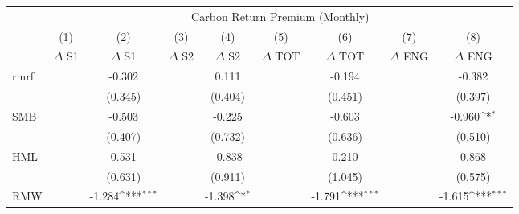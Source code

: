 {
\def\sym#1{\ifmmode^{#1}\else\(^{#1}\)\fi}
\begin{tabular}{l*{8}{c}}
\hline\hline
                    &\multicolumn{8}{c}{Carbon Return Premium (Monthly)}                                                                                                                            \\\cmidrule(lr){2-9}
                    &\multicolumn{1}{c}{(1)}&\multicolumn{1}{c}{(2)}&\multicolumn{1}{c}{(3)}&\multicolumn{1}{c}{(4)}&\multicolumn{1}{c}{(5)}&\multicolumn{1}{c}{(6)}&\multicolumn{1}{c}{(7)}&\multicolumn{1}{c}{(8)}\\
                    &\multicolumn{1}{c}{$\Delta$ S1}&\multicolumn{1}{c}{$\Delta$ S1}&\multicolumn{1}{c}{$\Delta$ S2}&\multicolumn{1}{c}{$\Delta$ S2}&\multicolumn{1}{c}{$\Delta$ TOT}&\multicolumn{1}{c}{$\Delta$ TOT}&\multicolumn{1}{c}{$\Delta$ ENG}&\multicolumn{1}{c}{$\Delta$ ENG}\\
\hline
rmrf                &                     &      -0.302         &                     &       0.111         &                     &      -0.194         &                     &      -0.382         \\
                    &                     &     (0.345)         &                     &     (0.404)         &                     &     (0.451)         &                     &     (0.397)         \\
SMB                 &                     &      -0.503         &                     &      -0.225         &                     &      -0.603         &                     &      -0.960\sym{*}  \\
                    &                     &     (0.407)         &                     &     (0.732)         &                     &     (0.636)         &                     &     (0.510)         \\
HML                 &                     &       0.531         &                     &      -0.838         &                     &       0.210         &                     &       0.868         \\
                    &                     &     (0.631)         &                     &     (0.911)         &                     &     (1.045)         &                     &     (0.575)         \\
RMW                 &                     &      -1.284\sym{***}&                     &      -1.398\sym{*}  &                     &      -1.791\sym{***}&                     &      -1.615\sym{***}\\

\end{tabular}}
